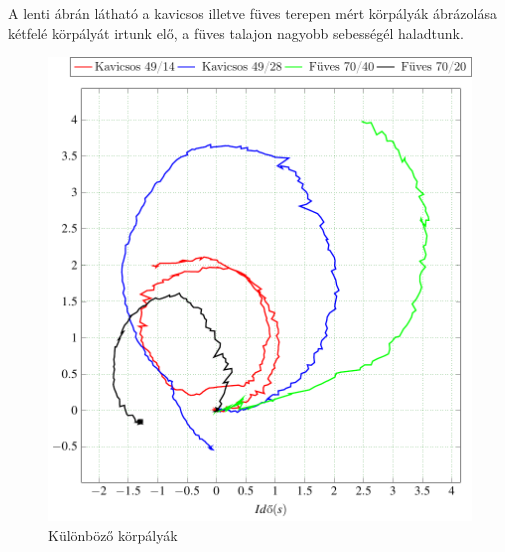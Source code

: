 








A lenti ábrán látható a kavicsos illetve füves terepen mért körpályák ábrázolása kétfelé körpályát irtunk elő, a füves talajon nagyobb sebességél haladtunk.

\begin{figure}[H]
  \includegraphics{tikz/KorpalyakKavicsos.pdf}
  \caption{Különböző körpályák}
  \label{fig:KorpalyakKavicsos}  
\end{figure}
